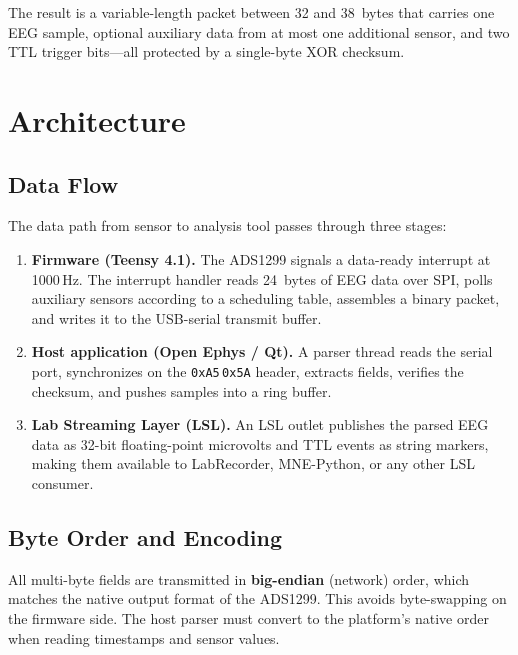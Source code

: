\documentclass[11pt,a4paper]{article}
\newcommand{\hexval}[1]{\texttt{0x#1}}
\begin{document}
The result is a variable-length packet between 32 and 38~bytes that carries one EEG sample, optional auxiliary data from at most one additional sensor, and two TTL trigger bits---all protected by a single-byte XOR checksum.

\section{Architecture}
\label{sec:architecture}

\subsection{Data Flow}

The data path from sensor to analysis tool passes through three stages:

\begin{enumerate}
    \item \textbf{Firmware (Teensy 4.1).}  The ADS1299 signals a data-ready interrupt at 1000\,Hz.  The interrupt handler reads 24~bytes of EEG data over SPI, polls auxiliary sensors according to a scheduling table, assembles a binary packet, and writes it to the USB-serial transmit buffer.
    \item \textbf{Host application (Open Ephys / Qt).}  A parser thread reads the serial port, synchronizes on the \hexval{A5}\,\hexval{5A} header, extracts fields, verifies the checksum, and pushes samples into a ring buffer.
    \item \textbf{Lab Streaming Layer (LSL).}  An LSL outlet publishes the parsed EEG data as 32-bit floating-point microvolts and TTL events as string markers, making them available to LabRecorder, MNE-Python, or any other LSL consumer.
\end{enumerate}

\subsection{Byte Order and Encoding}

All multi-byte fields are transmitted in \textbf{big-endian} (network) order, which matches the native output format of the ADS1299.  This avoids byte-swapping on the firmware side.  The host parser must convert to the platform's native order when reading timestamps and sensor values.

\end{document}
